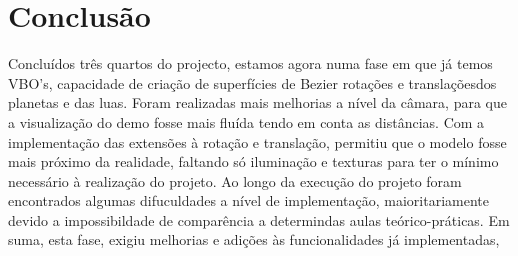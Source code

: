 \chapter{Conclusão}

Concluídos três quartos do projecto, estamos agora numa fase em que já temos VBO's, capacidade de criação de superfícies de Bezier rotações e translaçõesdos planetas e das luas.
Foram realizadas mais melhorias a nível da câmara, para que a visualização do demo fosse mais fluída tendo em conta as distâncias.
Com a implementação das extensões à rotação e translação, permitiu que o modelo fosse mais próximo da realidade, faltando só iluminação e texturas para ter o mínimo necessário à realização do projeto.
Ao longo da execução do projeto foram encontrados algumas difuculdades a nível de implementação, maioritariamente devido a impossibildade de comparência a determindas aulas teórico-práticas. 
Em suma, esta fase, exigiu melhorias e adições às funcionalidades já implementadas, 
